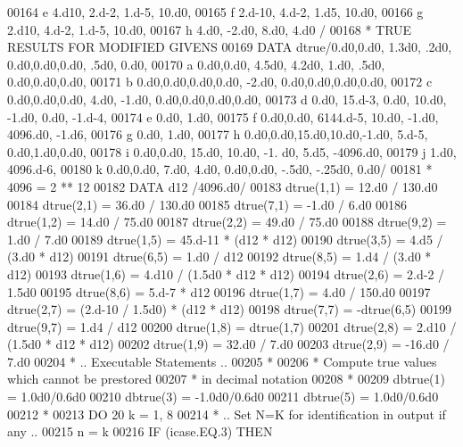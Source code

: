 \begin{DoxyCode}
00164      e          4.d10, 2.d-2, 1.d-5, 10.d0,
00165      f          2.d-10, 4.d-2, 1.d5, 10.d0,
00166      g          2.d10, 4.d-2, 1.d-5, 10.d0,
00167      h          4.d0, -2.d0, 8.d0, 4.d0    /
00168 \textcolor{comment}{*    TRUE RESULTS FOR MODIFIED GIVENS}
00169       \textcolor{keyword}{DATA} dtrue/0.d0,0.d0, 1.3d0, .2d0, 0.d0,0.d0,0.d0, .5d0, 0.d0,
00170      a           0.d0,0.d0, 4.5d0, 4.2d0, 1.d0, .5d0, 0.d0,0.d0,0.d0,
00171      b           0.d0,0.d0,0.d0,0.d0, -2.d0, 0.d0,0.d0,0.d0,0.d0,
00172      c           0.d0,0.d0,0.d0, 4.d0, -1.d0, 0.d0,0.d0,0.d0,0.d0,
00173      d           0.d0, 15.d-3, 0.d0, 10.d0, -1.d0, 0.d0, -1.d-4,
00174      e           0.d0, 1.d0,
00175      f           0.d0,0.d0, 6144.d-5, 10.d0, -1.d0, 4096.d0, -1.d6,
00176      g           0.d0, 1.d0,
00177      h           0.d0,0.d0,15.d0,10.d0,-1.d0, 5.d-5, 0.d0,1.d0,0.d0,
00178      i           0.d0,0.d0, 15.d0, 10.d0, -1. d0, 5.d5, -4096.d0,
00179      j           1.d0, 4096.d-6,
00180      k           0.d0,0.d0, 7.d0, 4.d0, 0.d0,0.d0, -.5d0, -.25d0, 0.d0/
00181 \textcolor{comment}{*                   4096 = 2 ** 12}
00182       \textcolor{keyword}{DATA} d12  /4096.d0/
00183       dtrue(1,1) = 12.d0 / 130.d0
00184       dtrue(2,1) = 36.d0 / 130.d0
00185       dtrue(7,1) = -1.d0 / 6.d0
00186       dtrue(1,2) = 14.d0 / 75.d0
00187       dtrue(2,2) = 49.d0 / 75.d0
00188       dtrue(9,2) = 1.d0 / 7.d0
00189       dtrue(1,5) = 45.d-11 * (d12 * d12)
00190       dtrue(3,5) = 4.d5 / (3.d0 * d12)
00191       dtrue(6,5) = 1.d0 / d12
00192       dtrue(8,5) = 1.d4 / (3.d0 * d12)
00193       dtrue(1,6) = 4.d10 / (1.5d0 * d12 * d12)
00194       dtrue(2,6) = 2.d-2 / 1.5d0
00195       dtrue(8,6) = 5.d-7 * d12
00196       dtrue(1,7) = 4.d0 / 150.d0
00197       dtrue(2,7) = (2.d-10 / 1.5d0) * (d12 * d12)
00198       dtrue(7,7) = -dtrue(6,5)
00199       dtrue(9,7) = 1.d4 / d12
00200       dtrue(1,8) = dtrue(1,7)
00201       dtrue(2,8) = 2.d10 / (1.5d0 * d12 * d12)
00202       dtrue(1,9) = 32.d0 / 7.d0
00203       dtrue(2,9) = -16.d0 / 7.d0
00204 \textcolor{comment}{*     .. Executable Statements ..}
00205 \textcolor{comment}{*}
00206 \textcolor{comment}{*     Compute true values which cannot be prestored}
00207 \textcolor{comment}{*     in decimal notation}
00208 \textcolor{comment}{*}
00209       dbtrue(1) = 1.0d0/0.6d0
00210       dbtrue(3) = -1.0d0/0.6d0
00211       dbtrue(5) = 1.0d0/0.6d0
00212 \textcolor{comment}{*}
00213       \textcolor{keywordflow}{DO} 20 k = 1, 8
00214 \textcolor{comment}{*        .. Set N=K for identification in output if any ..}
00215          n = k
00216          \textcolor{keywordflow}{IF} (icase.EQ.3) \textcolor{keywordflow}{THEN}

\end{DoxyCode}
